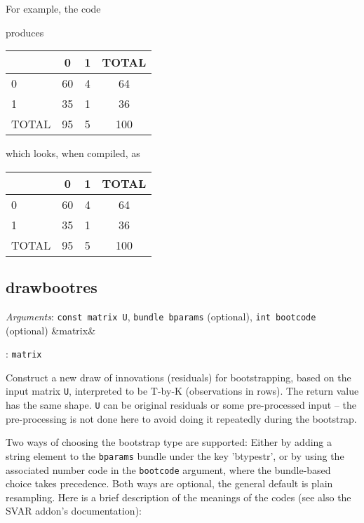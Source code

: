 \documentclass[11pt,english]{article}
\newcommand{\ArgRet}[2]{%
  {\it Arguments}: {#1}%
  \ifx&#2&%
  \else
  \par\smallskip\noindent {\it Return type}: \texttt{#2}
  \fi%
  \par\medskip\par%
  }
\begin{document}
For example, the code
produces
\begin{code}
\begin{tabular}{lccc}
\hline
 &	   0  &	    1  &	 TOTAL \\ \hline
   0 & 60	 & 4	 & 64 \\
   1 & 35	 & 1	 & 36 \\
TOTAL & 95	 & 5	 & 100 \\
\hline
\end{tabular}
\end{code}
which looks, when compiled, as
\begin{center}
\begin{tabular}{lccc}
\hline
 &	   0  &	    1  &	 TOTAL \\ \hline
   0 & 60	 & 4	 & 64 \\
   1 & 35	 & 1	 & 36 \\
TOTAL & 95	 & 5	 & 100 \\
\hline
\end{tabular}
\end{center}


\subsection{drawbootres}

\ArgRet{\texttt{const matrix U}, \texttt{bundle bparams} (optional),
\texttt{int bootcode} (optional)}{matrix}
Construct a new draw of innovations (residuals) for bootstrapping, based on the
input matrix \texttt{U}, interpreted to be T-by-K (observations in rows). The
return value has the same shape. \texttt{U} can be original residuals or some
pre-processed input -- the pre-processing is not done here to avoid doing it
repeatedly during the bootstrap.

Two ways of choosing the bootstrap type are supported: Either by adding a
string element to the \texttt{bparams} bundle under the key 'btypestr', or by
using the associated number code in the \texttt{bootcode} argument, where the
bundle-based choice takes precedence. Both ways are optional, the general
default is plain resampling. Here is a brief description of the meanings of the
codes (see also the SVAR addon's documentation):
\end{document}
